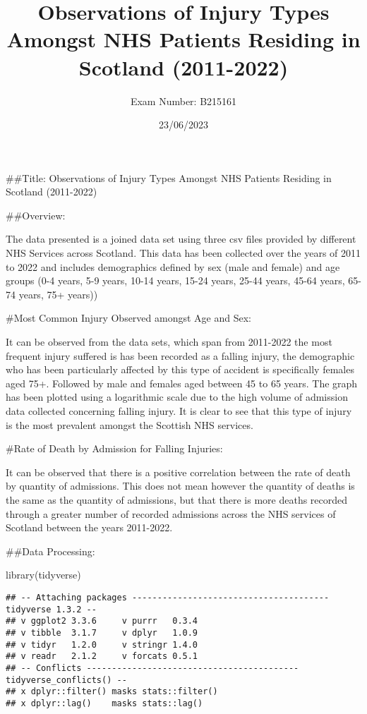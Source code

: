 \documentclass[
]{article}
\title{Observations of Injury Types Amongst NHS Patients Residing in
Scotland (2011-2022)}
\author{Exam Number: B215161}
\date{23/06/2023}
\newenvironment{Shaded}{\begin{snugshade}}{\end{snugshade}}
\newcommand{\FunctionTok}[1]{\textcolor[rgb]{0.00,0.00,0.00}{#1}}
\newcommand{\NormalTok}[1]{#1}
\begin{document}
\maketitle

{
\setcounter{tocdepth}{3}
\tableofcontents
}
\#\#Title: Observations of Injury Types Amongst NHS Patients Residing in
Scotland (2011-2022)

\#\#Overview:

The data presented is a joined data set using three csv files provided
by different NHS Services across Scotland. This data has been collected
over the years of 2011 to 2022 and includes demographics defined by sex
(male and female) and age groups (0-4 years, 5-9 years, 10-14 years,
15-24 years, 25-44 years, 45-64 years, 65-74 years, 75+ years))

\#Most Common Injury Observed amongst Age and Sex:

It can be observed from the data sets, which span from 2011-2022 the
most frequent injury suffered is has been recorded as a falling injury,
the demographic who has been particularly affected by this type of
accident is specifically females aged 75+. Followed by male and females
aged between 45 to 65 years. The graph has been plotted using a
logarithmic scale due to the high volume of admission data collected
concerning falling injury. It is clear to see that this type of injury
is the most prevalent amongst the Scottish NHS services.

\#Rate of Death by Admission for Falling Injuries:

It can be observed that there is a positive correlation between the rate
of death by quantity of admissions. This does not mean however the
quantity of deaths is the same as the quantity of admissions, but that
there is more deaths recorded through a greater number of recorded
admissions across the NHS services of Scotland between the years
2011-2022.

\#\#Data Processing:

\begin{Shaded}
\begin{Highlighting}[]
\FunctionTok{library}\NormalTok{(tidyverse)}
\end{Highlighting}
\end{Shaded}

\begin{verbatim}
## -- Attaching packages --------------------------------------- tidyverse 1.3.2 --
## v ggplot2 3.3.6     v purrr   0.3.4
## v tibble  3.1.7     v dplyr   1.0.9
## v tidyr   1.2.0     v stringr 1.4.0
## v readr   2.1.2     v forcats 0.5.1
## -- Conflicts ------------------------------------------ tidyverse_conflicts() --
## x dplyr::filter() masks stats::filter()
## x dplyr::lag()    masks stats::lag()
\end{verbatim}
\end{document}
